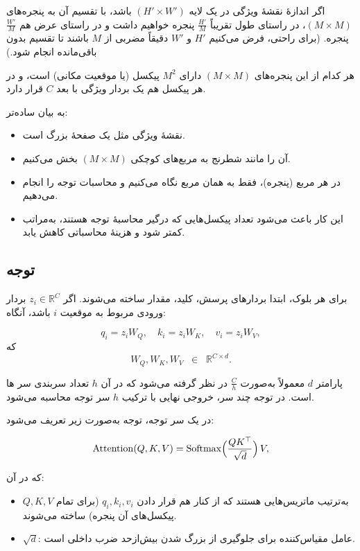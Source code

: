 اگر اندازهٔ نقشهٔ ویژگی در یک لایه 
\(\displaystyle (H' \times W')\) باشد، 
با تقسیم آن به پنجره‌های 
\(\displaystyle (M \times M)\)، 
در راستای طول تقریباً 
\(\displaystyle \tfrac{H'}{M}\) پنجره خواهیم داشت 
و در راستای عرض هم 
\(\displaystyle \tfrac{W'}{M}\) پنجره.
(برای راحتی، فرض می‌کنیم 
\(\displaystyle H'\) و \(\displaystyle W'\) 
دقیقاً مضربی از \(\displaystyle M\) باشند 
تا تقسیم بدون باقی‌مانده انجام شود.)

هر کدام از این پنجره‌های 
\(\displaystyle (M \times M)\) 
دارای 
\(\displaystyle M^2\) پیکسل (یا موقعیت مکانی) است، 
و در هر پیکسل هم یک بردار ویژگی با بعد \(\displaystyle C\) قرار دارد.

به بیان ساده‌تر:
\begin{itemize}
	\item نقشهٔ ویژگی مثل یک صفحهٔ بزرگ است.
	\item آن را مانند شطرنج به مربع‌های کوچکی \(\displaystyle (M \times M)\) بخش می‌کنیم.
	\item در هر مربع (پنجره)، فقط به همان مربع نگاه می‌کنیم و محاسبات  توجه  را انجام می‌دهیم.
	\item این کار باعث می‌شود تعداد پیکسل‌هایی که درگیر محاسبهٔ توجه هستند، 
	به‌مراتب کمتر شود و هزینهٔ محاسباتی کاهش یابد.
\end{itemize}


\subsection{توجه}

برای هر بلوک، ابتدا بردارهای پرسش، کلید، مقدار ساخته می‌شوند. 
اگر \(\displaystyle z_i \in \mathbb{R}^C\) بردار ورودی مربوط به موقعیت \(i\) باشد، آنگاه:

\[
q_i = z_i W_Q, 
\quad
k_i = z_i W_K,
\quad
v_i = z_i W_V,
\]
که 
\[
W_Q, W_K, W_V \;\;\in \;\;\mathbb{R}^{C \times d}.
\]

پارامتر \(\displaystyle d\) معمولاً به‌صورت \(\displaystyle \tfrac{C}{h}\) در نظر گرفته می‌شود 
که در آن \(\displaystyle h\) تعداد سربندی  سر ها است. 
در توجه چند سر، خروجی نهایی با ترکیب \(\displaystyle h\) سر توجه محاسبه می‌شود.

در یک سر توجه، توجه به‌صورت زیر تعریف می‌شود:

\[
\mathrm{Attention}(Q, K, V)
=
\mathrm{Softmax}\Bigl(\frac{QK^\top}{\sqrt{d}}\Bigr)\,V,
\]

که در آن:

\begin{itemize}
	\item \(\displaystyle Q, K, V\) به‌ترتیب ماتریس‌هایی هستند که از کنار هم قرار دادن 
	\(\displaystyle q_i, k_i, v_i\) (برای تمام پیکسل‌های آن پنجره) ساخته می‌شوند.
	\item \(\displaystyle \sqrt{d}\): عامل مقیاس‌کننده برای جلوگیری از بزرگ شدن بیش‌ازحد ضرب داخلی است.
\end{itemize}

